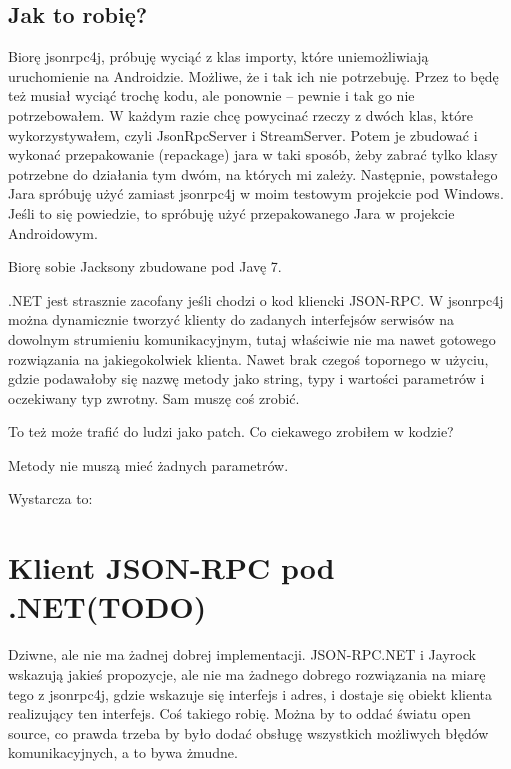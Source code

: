 \subsection{Jak to robię?}
Biorę jsonrpc4j, próbuję wyciąć z klas importy, które uniemożliwiają uruchomienie na Androidzie. Możliwe, że i tak ich nie potrzebuję. Przez to będę też musiał wyciąć trochę kodu, ale ponownie -- pewnie i tak go nie potrzebowałem.
W każdym razie chcę powycinać rzeczy z dwóch klas, które wykorzystywałem, czyli JsonRpcServer i StreamServer. Potem je zbudować i wykonać przepakowanie (repackage) jara w taki sposób, żeby zabrać tylko klasy potrzebne do działania tym dwóm, na których mi zależy. Następnie, powstałego Jara spróbuję użyć zamiast jsonrpc4j w moim testowym projekcie pod Windows. Jeśli to się powiedzie, to spróbuję użyć przepakowanego Jara w projekcie Androidowym.

Biorę sobie Jacksony zbudowane pod Javę 7.

.NET jest strasznie zacofany jeśli chodzi o kod kliencki JSON-RPC. W jsonrpc4j można dynamicznie tworzyć klienty do zadanych interfejsów serwisów na dowolnym strumieniu komunikacyjnym, tutaj właściwie nie ma nawet gotowego rozwiązania na jakiegokolwiek klienta. Nawet brak czegoś topornego w użyciu, gdzie podawałoby się nazwę metody jako string, typy i wartości parametrów i oczekiwany typ zwrotny.
Sam muszę coś zrobić.

To też może trafić do ludzi jako patch.
Co ciekawego zrobiłem w kodzie?

Metody nie muszą mieć żadnych parametrów.

Wystarcza to:
		


\section{Klient JSON-RPC pod .NET(TODO)}
Dziwne, ale nie ma żadnej dobrej implementacji. JSON-RPC.NET i Jayrock wskazują jakieś propozycje, ale nie ma żadnego dobrego rozwiązania na miarę tego z jsonrpc4j, gdzie wskazuje się interfejs i adres, i dostaje się obiekt klienta realizujący ten interfejs.
Coś takiego robię. Można by to oddać światu open source, co prawda trzeba by było dodać obsługę wszystkich możliwych błędów komunikacyjnych, a to bywa żmudne.

